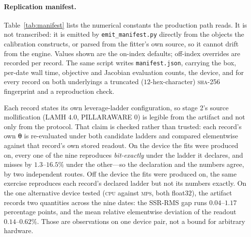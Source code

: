 \documentclass[11pt]{article}
\providecommand{\1}{\mathbf 1}
\newcommand{\bth}{{\boldsymbol{\theta}}}
\begin{document}
\begin{table}[htbp]
\centering{\small}
\caption{Elasticity-scaled readout-Jacobian spectrum at the nine shipped SPX fits, seven free
coordinates---the readout map differentiated, objective weights and ridge excluded---generated
from \texttt{jacobian\_7free\_ALL.json} by \texttt{emit\_jacobian\_table.py}. \emph{stage} is which
stage of the two-stage protocol that date's shipped fit came from. The lower block averages the
softest singular vector's loadings over the nine dates, sorted.}
\label{tab:jac7}
\end{table}

\paragraph{Replication manifest.} Table~\ref{tab:manifest} lists the numerical constants the
production path reads. It is not transcribed: it is emitted by \texttt{emit\_manifest.py} directly
from the objects the calibration constructs, or parsed from the fitter's own source, so it cannot
drift from the engine. Values shown are the on-index defaults; off-index overrides are recorded per
record. The same script writes \texttt{manifest.json}, carrying the box, per-date wall time,
objective and Jacobian evaluation counts, the device, and for every record on both underlyings a
truncated ($12$-hex-character) \textsc{sha}-256 fingerprint and a reproduction check.

Each record states its own leverage-ladder configuration, so stage 2's source mollification
(LAMH $4.0$, PILLARAWARE $0$) is legible from the artifact and not only from the protocol. That
claim is checked rather than trusted: each record's own $\bth$ is re-evaluated under both candidate
ladders and compared elementwise against that record's own stored readout. On the device the fits
were produced on, every one of the nine reproduces \emph{bit-exactly} under the ladder it declares,
and misses by $1.3$--$16.5\%$ under the other---so the declaration and the numbers agree, by two
independent routes. Off the device the fits were produced on, the same exercise reproduces each
record's declared ladder but not its numbers exactly. On the one alternative device tested
(\textsc{cpu} against \textsc{mps}, both float$32$), the artifact records two quantities across the
nine dates: the SSR-RMS gap runs $0.04$--$1.17$ percentage points, and the mean relative elementwise
deviation of the readout $0.14$--$0.62\%$. Those are observations on one device pair, not a bound
for arbitrary hardware.
\end{document}
